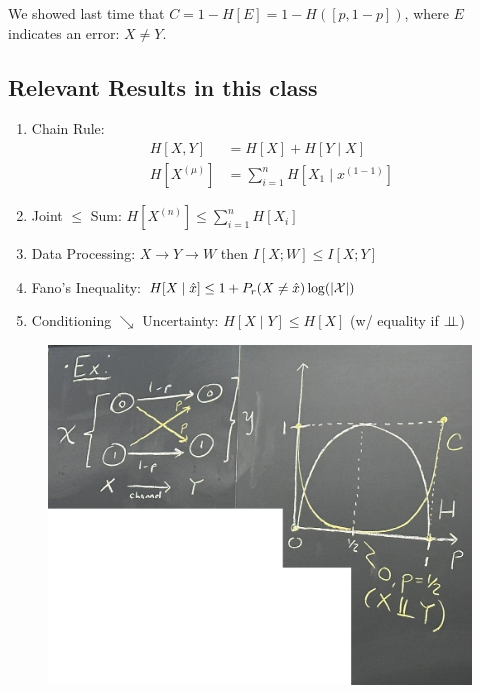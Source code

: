 We showed last time that $C=1-H[E] = 1 - H([p, 1-p])$, where $E$ indicates an error: $X\neq Y$.

\subsection{Relevant Results in this class}
\begin{enumerate}
    \item Chain Rule: 
    \begin{align*}
        H[X, Y] &= H[X]+H[Y \mid X] \\
        H\left[X^{(\mu)}\right] &= \sum_{i=1}^n H\left[X_1 \mid x^{(1-1)}\right]
    \end{align*}
    \item Joint $\leq$ Sum: $\displaystyle H\left[X^{(n)}\right] \leq \sum_{i=1}^n H\left[X_i\right]$
    \item Data Processing: $X \rightarrow Y \rightarrow W$ then $I[X ; W] \leq I[X ; Y]$
    \item Fano's Inequality: $H[X \mid \hat{x}] \leq 1+P_r(X \neq \hat{x}) \log (|\mathcal{X}|)$
    \item Conditioning $\searrow$ Uncertainty: $H[X \mid Y] \leq H[X]$ 
    (w/ equality if $\mathrel{\perp\!\!\!\perp}$)
\end{enumerate}

\begin{figure}[h]
    \centering
    \includegraphics[scale=0.14]{lectures/wk13/img/capacity.png}
    \label{fig:capacity}
\end{figure}

